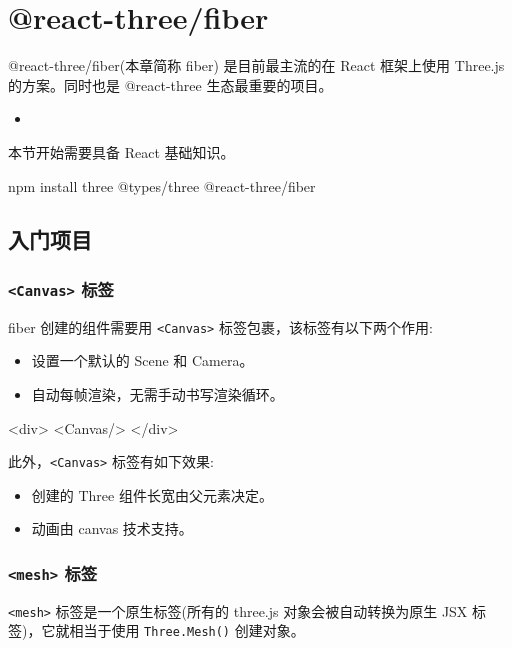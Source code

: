 \section{@react-three/fiber}

@react-three/fiber(本章简称 fiber) 是目前最主流的在 React 框架上使用 Three.js 的方案。同时也是 @react-three 生态最重要的项目。
\begin{itemize}
  \item {}
\end{itemize}

本节开始需要具备 React 基础知识。

\begin{bash}
npm install three @types/three @react-three/fiber
\end{bash}

\subsection{入门项目}

\subsubsection*{\texttt{<Canvas>} 标签}

fiber 创建的组件需要用 \texttt{<Canvas>} 标签包裹，该标签有以下两个作用:
\begin{itemize}
  \item 设置一个默认的 Scene 和 Camera。
  \item 自动每帧渲染，无需手动书写渲染循环。
\end{itemize}

\begin{JavaScript}
<div>
  <Canvas/>
</div>
\end{JavaScript}

此外，\texttt{<Canvas>} 标签有如下效果:
\begin{itemize}
  \item 创建的 Three 组件长宽由父元素决定。
  \item 动画由 canvas 技术支持。
\end{itemize}

\subsubsection*{\texttt{<mesh>} 标签}

\texttt{<mesh>} 标签是一个原生标签(所有的 three.js 对象会被自动转换为原生 JSX 标签)，它就相当于使用 \texttt{Three.Mesh()} 创建对象。

